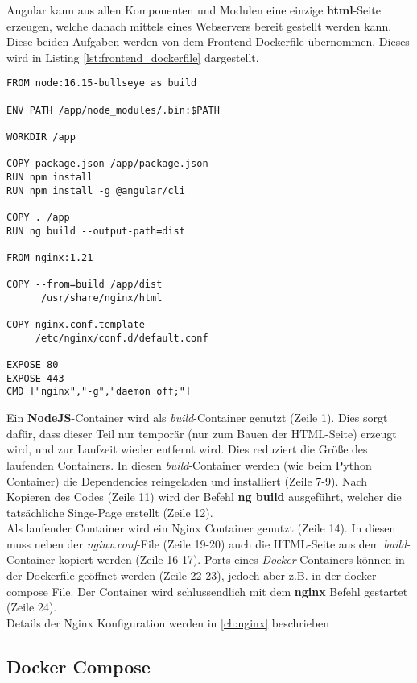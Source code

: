 Angular kann aus allen Komponenten und Modulen eine einzige \textbf{html}-Seite erzeugen, welche danach mittels eines Webservers bereit gestellt werden kann. Diese beiden Aufgaben werden von dem Frontend Dockerfile übernommen. Dieses wird in Listing \ref{lst:frontend_dockerfile} dargestellt.

\begin{lstlisting}[caption={Backend Dockerfile},captionpos=b,showstringspaces=false, basicstyle=\small,label={lst:frontend_dockerfile}]
FROM node:16.15-bullseye as build

ENV PATH /app/node_modules/.bin:$PATH

WORKDIR /app

COPY package.json /app/package.json
RUN npm install
RUN npm install -g @angular/cli

COPY . /app
RUN ng build --output-path=dist

FROM nginx:1.21

COPY --from=build /app/dist
      /usr/share/nginx/html

COPY nginx.conf.template 
     /etc/nginx/conf.d/default.conf

EXPOSE 80
EXPOSE 443
CMD ["nginx","-g","daemon off;"]
\end{lstlisting}

Ein \textbf{NodeJS}-Container wird als \textit{build}-Container genutzt (Zeile 1). 
Dies sorgt dafür, dass dieser Teil nur temporär (nur zum Bauen der HTML-Seite) erzeugt wird, und zur Laufzeit wieder entfernt wird.
Dies reduziert die Größe des laufenden Containers.
In diesen \textit{build}-Container werden (wie beim Python Container) die Dependencies reingeladen und installiert (Zeile 7-9).
Nach Kopieren des Codes (Zeile 11) wird der Befehl \textbf{ng build} ausgeführt, welcher die tatsächliche Singe-Page erstellt (Zeile 12). \\
Als laufender Container wird ein Nginx Container genutzt (Zeile 14).
In diesen muss neben der \textit{nginx.conf}-File (Zeile 19-20) auch die HTML-Seite aus dem \textit{build}-Container kopiert werden (Zeile 16-17).
Ports eines \textit{Docker}-Containers können in der Dockerfile geöffnet werden (Zeile 22-23), jedoch aber z.B. in der docker-compose File.
Der Container wird schlussendlich mit dem \textbf{nginx} Befehl gestartet (Zeile 24).\\
Details der Nginx Konfiguration werden in \ref{ch:nginx} beschrieben


\subsection{Docker Compose}

